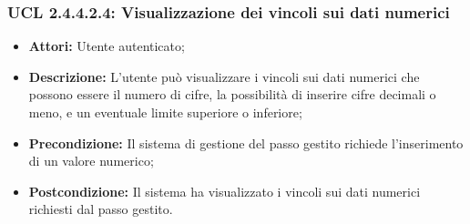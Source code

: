 \hypertarget{L2.4.4.2.4}{}
\subsubsection{UCL 2.4.4.2.4: Visualizzazione dei vincoli sui dati numerici}
\begin{itemize}
\item \textbf{Attori:} Utente autenticato;
\item \textbf{Descrizione:} L'utente può visualizzare i vincoli sui dati numerici che possono essere il numero di cifre, la possibilità di inserire cifre decimali o meno, e un eventuale limite superiore o inferiore;
\item \textbf{Precondizione:} Il sistema di gestione del passo gestito richiede l'inserimento di un valore numerico;
\item \textbf{Postcondizione:} Il sistema ha visualizzato i vincoli sui dati numerici richiesti dal passo gestito.
\end{itemize}

\hypertarget{L2.4.4.3}{}
